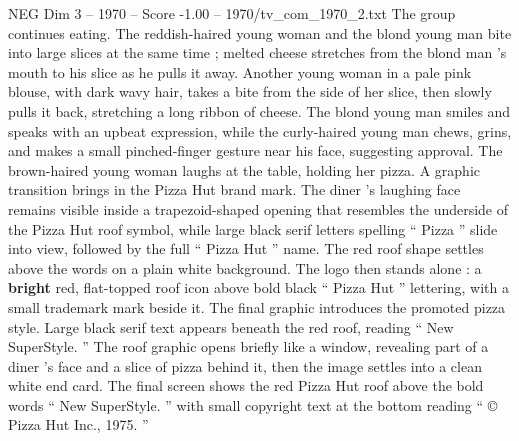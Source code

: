 \begin{textsample}{NEG Dim 3 – 1970 – Score -1.00 – 1970/tv\_com\_1970\_2.txt}
The group continues eating.
The reddish-haired young woman and the blond young man bite into large slices at the same time ; melted cheese stretches from the blond man ’s mouth to his slice as he pulls it away.
Another young woman in a pale pink blouse, with dark wavy hair, takes a bite from the side of her slice, then slowly pulls it back, stretching a long ribbon of cheese.
The blond young man smiles and speaks with an upbeat expression, while the curly-haired young man chews, grins, and makes a small pinched-finger gesture near his face, suggesting approval.
The brown-haired young woman laughs at the table, holding her pizza.
A graphic transition brings in the Pizza Hut brand mark.
The diner ’s laughing face remains visible inside a trapezoid-shaped opening that resembles the underside of the Pizza Hut roof symbol, while large black serif letters spelling “ Pizza ” slide into view, followed by the full “ Pizza Hut ” name.
The red roof shape settles above the words on a plain white background.
The logo then stands alone : a \textbf{bright} red, flat-topped roof icon above bold black “ Pizza Hut ” lettering, with a small trademark mark beside it.
The final graphic introduces the promoted pizza style.
Large black serif text appears beneath the red roof, reading “ New SuperStyle. ” The roof graphic opens briefly like a window, revealing part of a diner ’s face and a slice of pizza behind it, then the image settles into a clean white end card.
The final screen shows the red Pizza Hut roof above the bold words “ New SuperStyle. ” with small copyright text at the bottom reading “ {\EmojiFont ©} Pizza Hut Inc., 1975. ”

\end{textsample}
